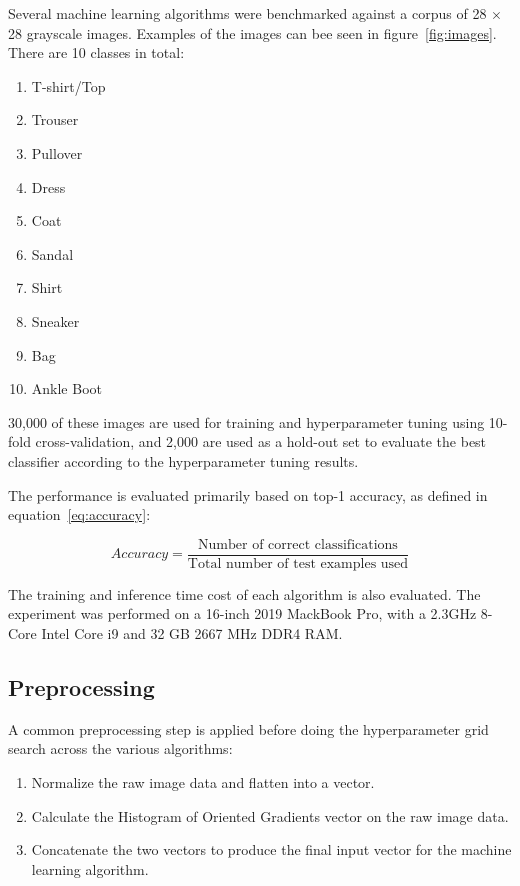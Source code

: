 \documentclass[landscape,twocolumn]{article}
\begin{document}
Several machine learning algorithms were benchmarked against a corpus of 28 $\times$ 28 grayscale images. Examples of the images can bee seen in figure~\ref{fig:images}. There are 10 classes in total:
\begin{enumerate}
\item T-shirt/Top
\item Trouser
\item Pullover
\item Dress
\item Coat
\item Sandal
\item Shirt
\item Sneaker
\item Bag
\item Ankle Boot
\end{enumerate}

30,000 of these images are used for training and hyperparameter tuning using 10-fold cross-validation, and 2,000 are used as a hold-out set to evaluate the best classifier according to the hyperparameter tuning results.

The performance is evaluated primarily based on top-1 accuracy, as defined in equation~\ref{eq:accuracy}:

\begin{equation}
\label{eq:accuracy}
Accuracy = \frac{\text{Number of correct classifications}}{\text{Total number of test examples used}}
\end{equation}

The training and inference time cost of each algorithm is also evaluated. The experiment was performed on a 16-inch 2019 MackBook Pro, with a 2.3GHz 8-Core Intel Core i9 and 32 GB 2667 MHz DDR4 RAM\@.

\subsection{Preprocessing}
A common preprocessing step is applied before doing the hyperparameter grid search across the various algorithms:
\begin{enumerate}
\item Normalize the raw image data and flatten into a vector.
\item Calculate the Histogram of Oriented Gradients vector on the raw image data.
\item Concatenate the two vectors to produce the final input vector for the machine learning algorithm.
\end{enumerate}
\end{document}
